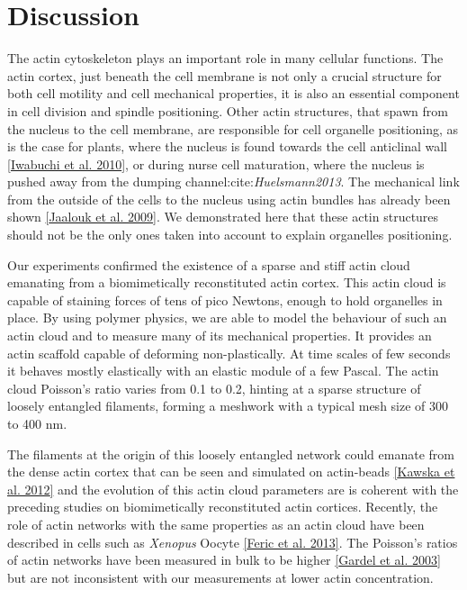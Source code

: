 \documentclass[A4paperpaper,11pt,english]{sphinxmanual}
\begin{document}
\section{Discussion}
\label{index-latex:discussion}
The actin cytoskeleton plays an important role in many cellular functions.  The
actin cortex, just beneath the cell membrane is not only a crucial structure
for both cell motility and cell mechanical properties, it is also an essential
component in cell division and spindle positioning.  Other actin structures,
that spawn from the nucleus to the cell membrane, are responsible for cell
organelle positioning, as is the case for plants, where the nucleus is found
towards the cell anticlinal wall {\hyperref[index-latex:iwabuchi2010]{{[}Iwabuchi et al. 2010{]}}}, or during nurse cell
maturation, where the nucleus is pushed away from the dumping
channel:cite:\emph{Huelsmann2013}. The mechanical link from the outside of the cells
to the nucleus using actin bundles has already been shown {\hyperref[index-latex:jaalouk2009]{{[}Jaalouk et al. 2009{]}}}.
We demonstrated here that these actin structures should not be the only ones
taken into account to explain organelles positioning.

Our experiments confirmed the existence of a sparse and stiff actin cloud emanating
from a biomimetically reconstituted actin cortex.  This actin cloud is capable
of staining forces of tens of pico Newtons, enough to hold organelles in place. By using polymer physics,
we are able to model the behaviour of such an actin cloud and
to measure many of its mechanical properties. It provides an
actin scaffold capable of deforming non-plastically. At time scales of few
seconds it behaves mostly elastically with an elastic module of a few Pascal.
The actin cloud Poisson’s ratio varies from 0.1 to 0.2, hinting at a
sparse structure of loosely entangled filaments, forming a meshwork with a
typical mesh size of 300 to 400 nm.

The filaments at the origin of this loosely entangled network could emanate
from the dense actin cortex that can be seen and simulated on actin-beads
{\hyperref[index-latex:kawska2012]{{[}Kawska et al. 2012{]}}} and the evolution of this actin cloud parameters are is
coherent with the preceding studies on biomimetically reconstituted actin
cortices. Recently, the role of actin networks with the same properties as an
actin cloud have been described in cells such as \emph{Xenopus} Oocyte
{\hyperref[index-latex:feric2013]{{[}Feric et al. 2013{]}}}. The Poisson’s ratios of actin networks have been measured in
bulk to be higher {\hyperref[index-latex:gardel2003]{{[}Gardel et al. 2003{]}}} but are not inconsistent with our
measurements at lower actin concentration.
\end{document}
